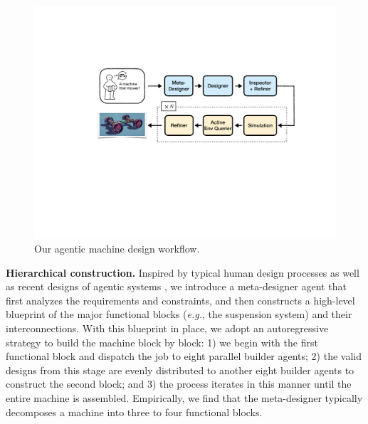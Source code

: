 \documentclass{article} %
\makeatletter
\newcommand*{\eg}{{\it e.g.}\@\xspace}
\theoremstyle{plain}
\theoremstyle{definition}
\makeatother
\begin{document}
\begin{figure}
  \vspace{-5mm}
  \centering
  \includegraphics[width=\linewidth]{figures/besiegefield_pipeline_compressed.pdf}
  \vspace{-6mm}
  \caption{\footnotesize Our agentic machine design workflow.}
  \label{fig:multi-agent-detail}
  \vspace{-3mm}
\end{figure}

\textbf{Hierarchical construction.} Inspired by typical human design processes as well as recent designs of agentic systems \citep{xiao2025verbalized,teng2025atom,zhang2024aflow}, we introduce a meta-designer agent that first analyzes the requirements and constraints, and then constructs a high-level blueprint of the major functional blocks (\eg, the suspension system) and their interconnections. With this blueprint in place, we adopt an autoregressive strategy to build the machine block by block: 1) we begin with the first functional block and dispatch the job to eight parallel builder agents; 2) the valid designs from this stage are evenly distributed to another eight builder agents to construct the second block; and 3) the process iterates in this manner until the entire machine is assembled. Empirically, we find that the meta-designer typically decomposes a machine into three to four functional blocks.
\end{document}
